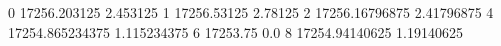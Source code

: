 0 17256.203125 2.453125
1 17256.53125 2.78125
2 17256.16796875 2.41796875
4 17254.865234375 1.115234375
6 17253.75 0.0
8 17254.94140625 1.19140625
